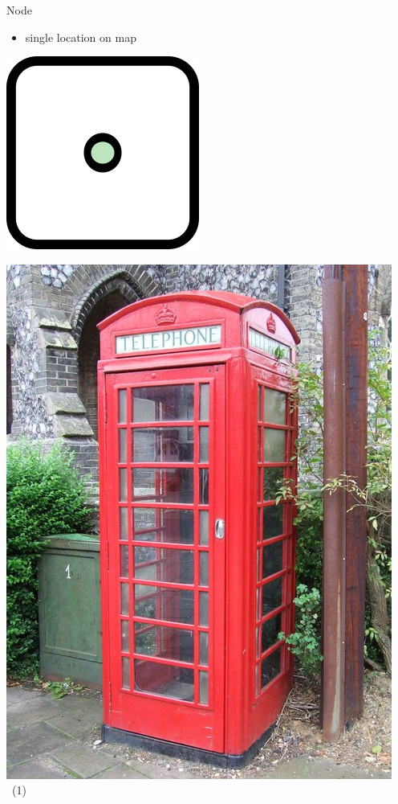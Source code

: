 \documentclass{beamer}
\begin{document}
	\begin{frame}{Node}
		\begin{itemize}
			\item single location on map
		\end{itemize}
		
		\vfill
		
		\begin{center}
			\begin{minipage}[b][0.6\textheight][c]{0.2\linewidth}
				\centering
				\includegraphics[width=0.5\linewidth,height=0.5\textheight,keepaspectratio]{images/240px-Mf_node.png}
			\end{minipage}
			\begin{minipage}[b][0.6\textheight][c]{0.4\linewidth}
				\centering
				\includegraphics[width=0.8\linewidth,height=0.8\textheight,keepaspectratio]{images/red-telephone-box-uk.jpg}~\tiny{(1)}

\end{minipage}
\end{center}
\end{frame}
\end{document}
